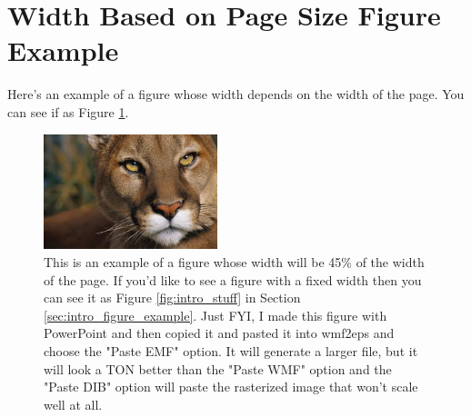 
\section{Width Based on Page Size Figure Example} \label{sec:appendxia_figure_example}
Here's an example of a figure whose width depends on the width
of the page. You can see if as Figure \ref{fig:appendix_some_pic}.

\begin{figure}[htbp]
  \centering
  \includegraphics[width=0.45\textwidth,natwidth=610,natheight=642]{figures/appendixa/some_pic.jpg}
  \caption[Example Width Based on Page Size Figure]{
    This is an example of a figure whose width will be 45\% of the
    width of the page. If you'd like to see a figure with a fixed
    width then you can see it as Figure \ref{fig:intro_stuff} in
    Section \ref{sec:intro_figure_example}. Just FYI, I made this
    figure with PowerPoint and then copied it and pasted it into
    wmf2eps and choose the "Paste EMF" option. It will generate
    a larger file, but it will look a TON better than the
    "Paste WMF" option and the "Paste DIB" option will paste the
    rasterized image that won't scale well at all.}
  \label{fig:appendix_some_pic}
\end{figure}
